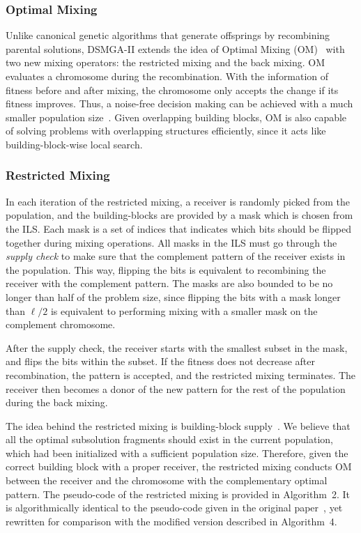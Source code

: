 \subsubsection{Optimal Mixing}
Unlike canonical genetic algorithms that generate offsprings by recombining parental solutions, DSMGA-II extends the idea of Optimal Mixing (OM)~\cite{thierens:OM} with two new mixing operators: the restricted mixing and the back mixing. OM evaluates a chromosome during the recombination. With the information of fitness before and after mixing, the chromosome only accepts the change if its fitness improves. Thus, a noise-free decision making can be achieved with a much smaller population size~\cite{goldberg:buildingblock}. Given overlapping building blocks, OM is also capable of solving problems with overlapping structures efficiently, since it acts like building-block-wise local search.


\subsubsection{Restricted Mixing}

In each iteration of the restricted mixing, a receiver is randomly picked from the population, and the building-blocks are provided by a mask which is chosen from the ILS. 
Each mask is a set of indices that indicates which bits should be flipped together during mixing operations. 
All masks in the ILS must go through the \textit{supply check} to make sure that the complement pattern of the receiver exists in the population. 
This way, flipping the bits is equivalent to recombining the receiver with the complement pattern. 
The masks are also bounded to be no longer than half of the problem size, since flipping the bits with a mask longer than $\ell/2$ is equivalent to performing mixing with a smaller mask on the complement chromosome. 


After the supply check, the receiver starts with the smallest subset in the mask, and flips the bits within the subset. 
If the fitness does not decrease after recombination, the pattern is accepted, and the restricted mixing terminates. 
The receiver then becomes a donor of the new pattern for the rest of the population during the back mixing. 


The idea behind the restricted mixing is building-block supply~\cite{goldberg:buildingblock}. We believe that all the optimal subsolution fragments should exist in the current population, which had been initialized with a sufficient population size. Therefore, given the correct building block with a proper receiver, the restricted mixing conducts OM between the receiver and the chromosome with the complementary optimal pattern. 
The pseudo-code of the restricted mixing is provided in Algorithm~2.
It is algorithmically identical to the pseudo-code given in the original paper~\cite{hsu:DSMGA2}, yet rewritten for comparison with the modified version described in Algorithm~4. 


